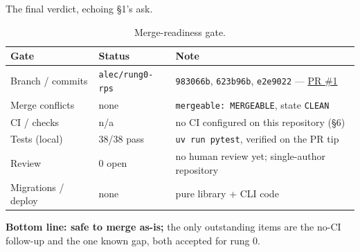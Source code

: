 \documentclass[11pt]{article}
\begin{document}
\noindent The final verdict, echoing \S1's ask.

\begin{table}[H]
\centering\small
\caption{Merge-readiness gate.}
\renewcommand{\arraystretch}{1.25}
\begin{tabular}{@{}p{4.0cm}p{3.4cm}p{5.6cm}@{}}
\toprule
Gate & Status & Note \\
\midrule
Branch / commits & \texttt{alec/rung0-rps} & \texttt{983066b}, \texttt{623b96b}, \texttt{e2e9022} --- \href{https://github.com/AlecROndo/drawmaha-solver/pull/1}{PR \#1} \\
Merge conflicts  & none & \texttt{mergeable: MERGEABLE}, state \texttt{CLEAN} \\
CI / checks      & n/a & no CI configured on this repository (\S6) \\
Tests (local)    & 38/38 pass & \texttt{uv run pytest}, verified on the PR tip \\
Review           & 0 open & no human review yet; single-author repository \\
Migrations / deploy & none & pure library + CLI code \\
\bottomrule
\end{tabular}
\end{table}

\noindent\textbf{Bottom line: safe to merge as-is;} the only outstanding items
are the no-CI follow-up and the one known gap, both accepted for rung 0.
\end{document}
